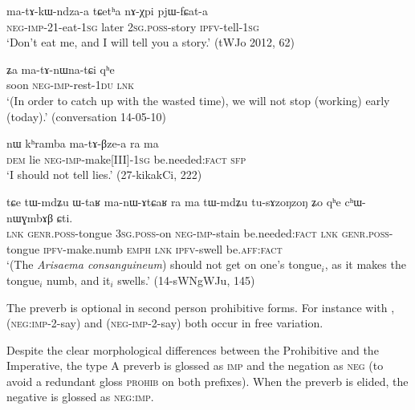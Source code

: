 \begin{exe}
\ex  \label{ex:matAkWndzaa}
\gll ma-tɤ-kɯ-ndza-a tɕetʰa nɤ-χpi pjɯ-fɕat-a \\
\textsc{neg}-\textsc{imp}-2\fl{}1-eat-\textsc{1sg} later \textsc{2sg}.\textsc{poss}-story \textsc{ipfv}-tell-\textsc{1sg} \\
\glt `Don't eat me, and I will tell you a story.' (tWJo 2012, 62)
\end{exe}

\begin{exe}
\ex  \label{ex:Za.matAnWnatCi}
\gll ʑa ma-tɤ-nɯna-tɕi qʰe \\
soon \textsc{neg}-\textsc{imp}-rest-\textsc{1du} \textsc{lnk} \\
\glt `(In order to catch up with the wasted time), we will not stop (working) early (today).' (conversation 14-05-10)
\end{exe}

\begin{exe}
\ex  \label{ex:khramba.matABzea}
\gll nɯ kʰramba ma-tɤ-βze-a ra ma \\
\textsc{dem} lie  \textsc{neg}-\textsc{imp}-make[III]-\textsc{1sg} be.needed:\textsc{fact} \textsc{sfp} \\
\glt `I should not tell lies.' (27-kikakCi, 222)
\end{exe}

\begin{exe}
\ex  \label{ex:manAtCaR.ra}
\gll tɕe tɯ-mdʑu ɯ-taʁ ma-nɯ-ɤtɕaʁ ra ma tɯ-mdʑu tu-sɤzoŋzoŋ ʑo qʰe cʰɯ-nɯɣmbɤβ ɕti. \\
\textsc{lnk} \textsc{genr}.\textsc{poss}-tongue \textsc{3sg}.\textsc{poss}-on \textsc{neg}-\textsc{imp}-stain be.needed:\textsc{fact} \textsc{lnk} \textsc{genr}.\textsc{poss}-tongue \textsc{ipfv}-make.numb \textsc{emph} \textsc{lnk} \textsc{ipfv}-swell be.\textsc{aff}:\textsc{fact} \\
\glt `(The \textit{Arisaema consanguineum}) should not get on one's tongue$_i$, as it makes the tongue$_i$ numb, and it$_i$ swells.' (14-sWNgWJu, 145)
\end{exe}

The preverb is optional in second person prohibitive forms. For instance with ,  (\textsc{neg}:\textsc{imp}-2-say) and  (\textsc{neg}-\textsc{imp}-2-say) both occur in free variation.

Despite the clear morphological differences between the Prohibitive and the Imperative, the type A preverb is glossed as \textsc{imp} and the negation as \textsc{neg} (to avoid a redundant gloss \textsc{prohib} on both prefixes). When the preverb is elided, the negative  is glossed as \textsc{neg}:\textsc{imp}.
 
